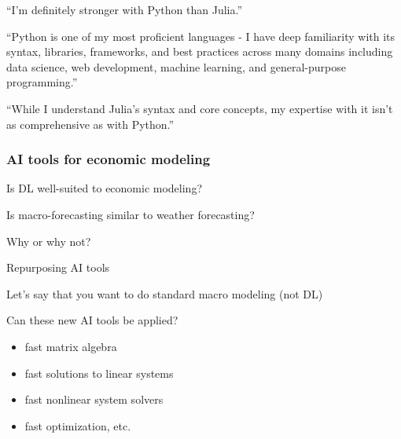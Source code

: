 \begin{frame}
    
    ``I'm definitely stronger with Python than Julia.''

    \vspace{0.5em}
    \vspace{0.5em}
    ``Python is one of my most proficient languages - I have deep familiarity with
    its syntax, libraries, frameworks, and best practices across many domains
    including data science, web development, machine learning, and
    general-purpose programming.''

    \vspace{0.5em}
    \vspace{0.5em}
    ``While I understand Julia's syntax and core concepts, my expertise with it
    isn't as comprehensive as with Python.''

\end{frame}

\begin{frame}
    \frametitle{AI tools for economic modeling}

    Is DL well-suited to economic modeling?

    \medskip

    \Eg Is macro-forecasting similar to weather forecasting?

    \medskip
    \medskip

    Why or why not?

\end{frame}




\begin{frame}{Repurposing AI tools}
    
    Let's say that you want to do standard macro modeling (not DL)

    \vspace{0.5em}
    Can these new AI tools be applied?

    \pause

    \vspace{0.5em}
    \vspace{0.5em}

    \begin{itemize}
        \item fast matrix algebra
        \vspace{0.5em}
        \item fast solutions to linear systems
        \vspace{0.5em}
        \item fast nonlinear system solvers
        \vspace{0.5em}
        \item fast optimization, etc.
    \end{itemize}

\end{frame}



